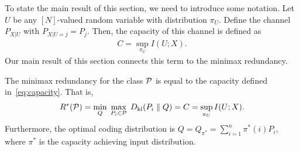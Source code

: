     To state the main result of this section, we need to introduce some notation. Let $U$ be any $[N]$-valued random variable with distribution $\pi_U$. Define the channel $P_{X|U}$ with $P_{X|U=j} = P_j$. Then, the capacity of this channel is defined as 
    \begin{align}
        C = \sup_{\pi_U} I(U; X).  \label{eq:capacity}
    \end{align}
    Our main result of this section connects this term to the minimax redundancy. 
    \begin{theorem}
         \label{thm:redundancy-capacity} The minimax redundancy for the class $\mathcal{P}$ is equal to the capacity defined in~\eqref{eq:capacity}. That is, 
         \begin{align}
             R^*(\mathcal{P}) = \min_{Q} \; \max_{P_i \in \mathcal{P}} \; D_{\text{kl}}(P_i \parallel Q) = C = \sup_{\pi_U} I(U;X).  
         \end{align}
         Furthermore, the optimal coding distribution is $Q = Q_{\pi^*} = \sum_{i=1}^n \pi^*(i) P_i$, where $\pi^*$ is the capacity achieving input distribution. 
    \end{theorem}
